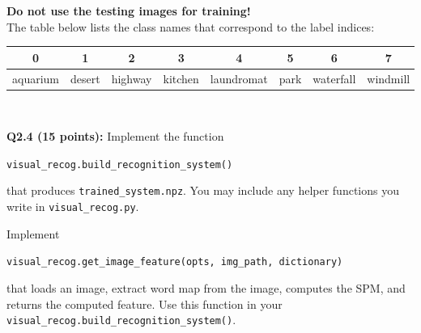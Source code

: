 \documentclass[10pt]{article}
\begin{document}
{\bf Do not use the testing images for training!}\\

The table below lists the class names that correspond to the label indices:
\begin{center}
\begin{tabular}{c@{~~}c@{~~}c@{~~}c@{~~}c@{~~}c@{~~}c@{~~}c} \toprule
0 & 1 & 2 & 3 & 4 & 5 & 6 & 7 \\ \midrule
aquarium & desert & highway & kitchen & laundromat & park & waterfall & windmill\\ \bottomrule
\end{tabular} \\
\end{center}

\par \noindent
{\bf Q2.4 (15 points):}
Implement the function
\begin{center}
{\tt visual\_recog.build\_recognition\_system()} 
\end{center}
that produces {\tt trained\_system.npz}. You may include any helper functions you write in {\tt visual\_recog.py}.

Implement 
\begin{center}
{\tt visual\_recog.get\_image\_feature(opts, img\_path, dictionary)} 
\end{center}
that loads an image, extract word map from the image, computes the SPM, and returns the computed feature. Use this function in your {\tt visual\_recog.build\_recognition\_system()}.

\end{document}

